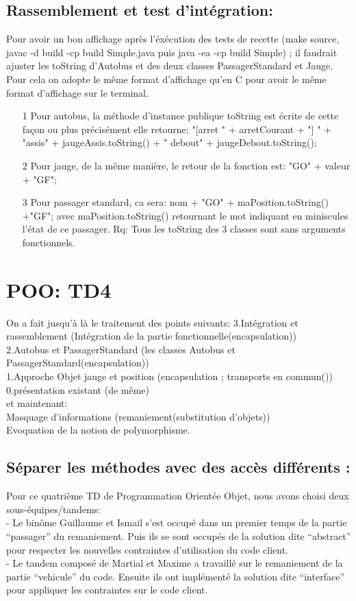 \documentclass{article}
\begin{document}
\subsection{Rassemblement et test d'intégration: }
Pour avoir un bon affichage après l’éxécution des tests de recette (make source, javac -d
build -cp build Simple.java puis java -ea -cp build Simple) ; il faudrait ajuster les toString d’Autobus et des deux classes PassagerStandard et Jauge. Pour cela on adopte le même format d’affichage qu’en C pour avoir le même format d’affichage sur le terminal.\\
\begin{enumerate}
    \item[1] Pour autobus, la méthode d’instance publique toString est écrite de cette façon ou plus
précisément elle retourne:
"[arret " + arretCourant + "] " + "assis" + jaugeAssis.toString() + " debout" + jaugeDebout.toString();
\item[2] Pour jauge, de la même manière, le retour de la fonction est:
"GO" + valeur + "GF";
\item[3] Pour passager standard, ca sera:
nom + "GO" + maPosition.toString() +"GF";
avec maPosition.toString() retournant le mot indiquant en miniscules l'état de ce passager.
Rq: Tous les toString des 3 classes sont sans arguments fonctionnels.
\end{enumerate}
\section{POO: TD4}
\par 
On a fait jusqu'à là le traitement des points suivants:
3.Intégration et rassemblement (Intégration de la partie fonctionnelle(encapsulation))
\\
2.Autobus et PassagerStandard (les classes Autobus et PassagerStandard(encapsulation))
\\
1.Approche Objet jauge et position (encapsulation ; transports en commun())
\\
0.présentation existant (de même)\\
et maintenant:\\
Masquage d'informations (remaniement(substitution d'objets))
\\ { Evoquation de la notion de polymorphisme.  }
\subsection{Séparer les méthodes avec des accès différents : }
Pour ce quatrième TD de Programmation Orientée Objet, nous avons choisi deux
sous-équipes/tandems:\\
- Le binôme Guillaume et Ismail s’est occupé dans un premier temps de la partie
“passager” du remaniement. Puis ils se sont occupés de la solution dite “abstract”
pour respecter les nouvelles contraintes d’utilisation du code client.\\
- Le tandem composé de Martial et Maxime a travaillé sur le remaniement de la partie
“vehicule” du code. Ensuite ils ont implémenté la solution dite “interface” pour
appliquer les contraintes sur le code client.\\
\end{document}
